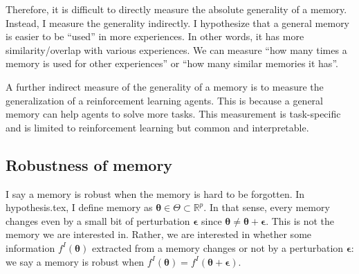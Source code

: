 \documentclass[12pt]{article}
\begin{document}
Therefore, it is difficult to directly measure the absolute generality of a memory. Instead, I measure the 
generality indirectly. I hypothesize that a general memory is easier to be ``used'' in more experiences. In other 
words, it has more similarity/overlap with various experiences. We can measure ``how many times a memory is used for other experiences'' 
or ``how many similar memories it has''.

A further indirect measure of the generality of a memory is to measure the generalization of a reinforcement learning agents. 
This is because a general memory can help agents to solve more tasks. This measurement is task-specific and is limited to 
reinforcement learning but common and interpretable.

\subsection{Robustness of memory}
I say a memory is robust when the memory is hard to be forgotten. In hypothesis.tex, I define memory as 
$\bm{\theta} \in \Theta \subset \mathbb{R}^p$. In that sense, every memory changes even by a small bit of 
perturbation $\bm{\epsilon}$ since $\bm{\theta} \neq \bm{\theta} + \bm{\epsilon}$. This is not the memory 
we are interested in. Rather, we are interested in whether some information $f^I(\bm{\theta})$ extracted from a memory changes or not 
by a perturbation $\bm{\epsilon}$: we say a memory is robust when $f^I(\bm{\theta}) = f^I(\bm{\theta}+ \bm{\epsilon})$.
\end{document}
